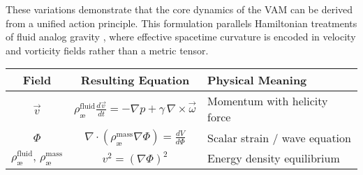 These variations demonstrate that the core dynamics of the VAM can be derived from a unified action principle. This formulation parallels Hamiltonian treatments of fluid analog gravity \cite{barcelo2011}, where effective spacetime curvature is encoded in velocity and vorticity fields rather than a metric tensor.

\begin{center}
    \begin{tabular}{|c|c|l|}
        \hline
        Field & Resulting Equation & Physical Meaning \\
        \hline
       $\vec{v}$ & $\rho_\text{\ae}^{\text{fluid}} \frac{d \vec{v}}{dt} = -\nabla p + \gamma\, \nabla \times \vec{\omega}$ & Momentum with helicity force \\
        $\Phi$ & $\nabla \cdot (\rho_\text{\ae}^{\text{mass}} \nabla \Phi) = \frac{dV}{d\Phi}$ & Scalar strain / wave equation \\
        $\rho_\text{\ae}^{\text{fluid}},\, \rho_\text{\ae}^{\text{mass}}$ & $v^2 = (\nabla \Phi)^2$ & Energy density equilibrium \\
        \hline
    \end{tabular}
\end{center}

